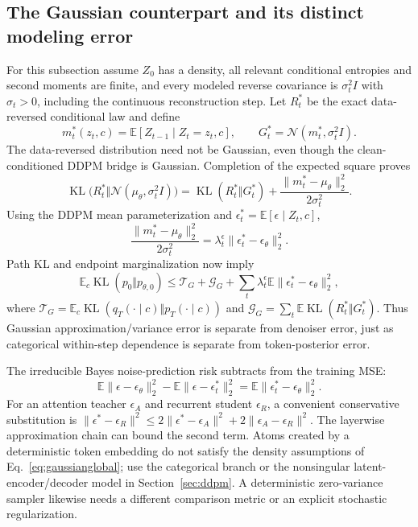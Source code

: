 \documentclass{article}
\theoremstyle{remark}\newtheorem{remark}[theorem]{Remark}
\newcommand{\E}{\mathbb E}
\newcommand{\KL}{\operatorname{KL}}
\begin{document}
\subsection{The Gaussian counterpart and its distinct modeling error}
For this subsection assume $Z_0$ has a density, all relevant conditional entropies and second moments are finite, and every modeled reverse covariance is $\sigma_t^2I$ with $\sigma_t>0$, including the continuous reconstruction step. Let $R_t^*$ be the exact data-reversed conditional law and define
\begin{equation}
 m_t^*(z_t,c)=\E[Z_{t-1}\mid Z_t=z_t,c],\qquad
 G_t^*=\mathcal N(m_t^*,\sigma_t^2I).
\end{equation}
The data-reversed distribution need not be Gaussian, even though the clean-conditioned DDPM bridge is Gaussian. Completion of the expected square proves
\begin{equation}
 \KL\bigl(R_t^*\Vert\mathcal N(\mu_\theta,\sigma_t^2I)\bigr)
 =\KL(R_t^*\Vert G_t^*)+
 \frac{\|m_t^*-\mu_\theta\|_2^2}{2\sigma_t^2}.
 \label{eq:gaussianprojectiongap}
\end{equation}
Using the DDPM mean parameterization and $\epsilon_t^*=\E[\epsilon\mid Z_t,c]$,
\begin{equation}
 \frac{\|m_t^*-\mu_\theta\|_2^2}{2\sigma_t^2}
 =\lambda_t^\epsilon\|\epsilon_t^*-\epsilon_\theta\|_2^2.
\end{equation}
Path KL and endpoint marginalization now imply
\begin{equation}
 \E_c\KL(p_0\Vert p_{\theta,0})\le
 \mathcal T_G+\mathcal G_G+
 \sum_t\lambda_t^\epsilon\E\|\epsilon_t^*-\epsilon_\theta\|_2^2,
 \label{eq:gaussianglobal}
\end{equation}
where $\mathcal T_G=\E_c\KL(q_T(\cdot\mid c)\Vert p_T(\cdot\mid c))$ and
$\mathcal G_G=\sum_t\E\KL(R_t^*\Vert G_t^*)$.
Thus Gaussian approximation/variance error is separate from denoiser error, just as categorical within-step dependence is separate from token-posterior error.

The irreducible Bayes noise-prediction risk subtracts from the training MSE:
\begin{equation}
 \E\|\epsilon-\epsilon_\theta\|_2^2-\E\|\epsilon-\epsilon_t^*\|_2^2
 =\E\|\epsilon_t^*-\epsilon_\theta\|_2^2.
\end{equation}
For an attention teacher $\epsilon_A$ and recurrent student $\epsilon_R$, a convenient conservative substitution is
$\|\epsilon^*-\epsilon_R\|^2\le2\|\epsilon^*-\epsilon_A\|^2+2\|\epsilon_A-\epsilon_R\|^2$.
The layerwise approximation chain can bound the second term. Atoms created by a deterministic token embedding do not satisfy the density assumptions of Eq.~\eqref{eq:gaussianglobal}; use the categorical branch or the nonsingular latent-encoder/decoder model in Section~\ref{sec:ddpm}. A deterministic zero-variance sampler likewise needs a different comparison metric or an explicit stochastic regularization.
\end{document}
